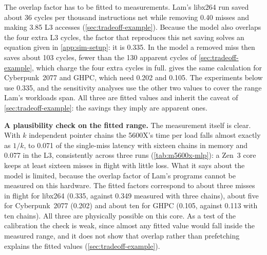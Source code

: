 The overlap factor has to be fitted to measurements. Lam's libx264 run saved about 36 cycles per thousand instructions net while removing 0.40 misses and making 3.85 L3 accesses (\cref{sec:tradeoff-example}). Because the model also overlaps the four extra L3 cycles, the factor that reproduces this net saving solves an equation given in \cref{app:sim-setup}: it is 0.335. In the model a removed miss then saves about 103 cycles, fewer than the 130 apparent cycles of \cref{sec:tradeoff-example}, which charge the four extra cycles in full.  gives the same calculation for Cyberpunk~2077 and GHPC, which need 0.202 and 0.105. The experiments below use 0.335, and the sensitivity analyses use the other two values to cover the range Lam's workloads span. All three are fitted values and inherit the caveat of \cref{sec:tradeoff-example}: the savings they imply are apparent ones.



\textbf{A plausibility check on the fitted range.} The measurement itself is clear. With $k$ independent pointer chains the 5600X's time per load falls almost exactly as $1/k$, to 0.071 of the single-miss latency with sixteen chains in memory and 0.077 in the L3, consistently across three runs (\cref{tab:m5600x-mlp}): a Zen~3 core keeps at least sixteen misses in flight with little loss. What it says about the model is limited, because the overlap factor of Lam's programs cannot be measured on this hardware. The fitted factors correspond to about three misses in flight for libx264 (0.335, against 0.349 measured with three chains), about five for Cyberpunk~2077 (0.202) and about ten for GHPC (0.105, against 0.113 with ten chains). All three are physically possible on this core. As a test of the calibration the check is weak, since almost any fitted value would fall inside the measured range, and it does not show that overlap rather than prefetching explains the fitted values (\cref{sec:tradeoff-example}).



